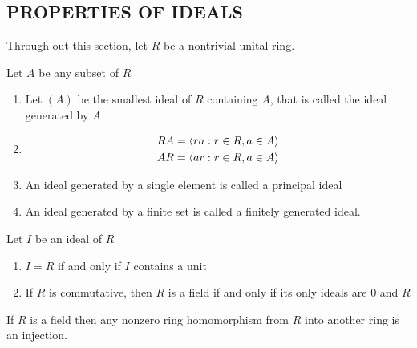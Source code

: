 \subsection{PROPERTIES OF IDEALS}

\begin{remark}
	Through out this section, let $R$ be a nontrivial unital ring.
\end{remark}

\begin{definition}
	Let $A$  be any subset of $R$
	\begin{enumerate}
		\item Let $(A)$ be the smallest ideal of $R$ containing $A$, that is called the ideal generated by $A$
		
		\item 
		\begin{align*}
			RA = \langle ra: r \in R, a \in A\rangle \\
			AR = \langle ar: r \in R, a \in A\rangle
		\end{align*}
		
		\item An ideal generated by a single element is called a principal ideal
		
		\item An ideal generated by a finite set is called a finitely generated ideal.
	\end{enumerate}
	
	
\end{definition}

\begin{proposition}
	Let $I$ be an ideal of $R$
	\begin{enumerate}
		\item $I = R$ if and only if $I$ contains a unit
		\item If $R$ is commutative, then $R$ is a field if and only if its only ideals are $0$ and $R$
	\end{enumerate}
\end{proposition}

\begin{corollary}
	If $R$ is a field then any nonzero ring homomorphism from $R$ into another ring is an injection.
\end{corollary}

